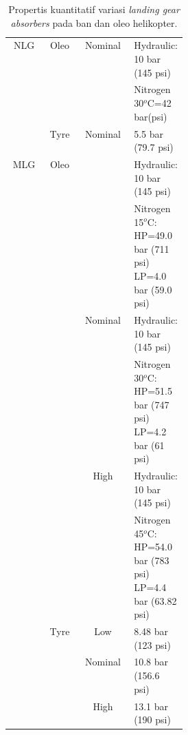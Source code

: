 \begin{longtable}{|c|c|c|m{0.3\linewidth}|}
	\caption{Propertis kuantitatif variasi \textit{landing gear absorbers} pada ban dan oleo helikopter.}
	\label{tb:propertiskuantitatif}								\\
	\hline
	\multirow{3}{*}{\centering NLG} & \multirow{2}{*}{\centering Oleo} & \multirow{2}{*}{Nominal} & Hydraulic: 10 bar (145 psi) \\
	\cline{4-4}
	&&& Nitrogen 30$^o$C=42 bar(psi)\\
	\cline{2-4}
	& Tyre & Nominal & 5.5 bar (79.7 psi)\\
	\hline
	\multirow{9}{*}{\centering MLG}&\multirow{6}{*}{\centering Oleo}& \centering \multirow{2}{*}{\centering Low}& Hydraulic: 10 bar (145 psi) \\
	\cline{4-4}
	&&& Nitrogen 15$^o$C: HP=49.0 bar (711 psi) LP=4.0 bar (59.0 psi) \\
	\cline{3-4}
	&& \centering Nominal & Hydraulic: 10 bar (145 psi) \\
	\cline{4-4}
	&&& Nitrogen 30$^o$C: HP=51.5 bar (747 psi) LP=4.2 bar (61 psi) \\
	\cline{3-4}
	&& \centering High & Hydraulic: 10 bar (145 psi) \\
	\cline{4-4}
	&&& Nitrogen 45$^o$C: HP=54.0 bar (783 psi) LP=4.4 bar (63.82 psi) \\
	\cline{2-4}
	& \centering Tyre & Low & 8.48 bar (123 psi)\\
	\cline{3-4}
	&& Nominal & 10.8 bar (156.6 psi)\\
	\cline{3-4}
	&& High & 13.1 bar (190 psi)\\
	\hline
\end{longtable}

